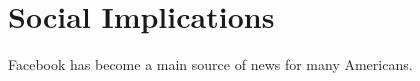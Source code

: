 
\section{Social Implications}


Facebook has become a main source of news for many Americans. \cite{tc_google_fb_partner}


